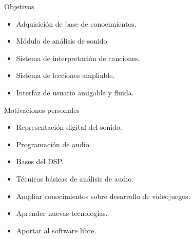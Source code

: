 \documentclass[11pt,xcolor=svgnames]{beamer}
\begin{document}
\begin{frame}{Objetivos}
  \Large
  \begin{itemize}
  \item Adquisición de base de conocimientos. \pause
  \item Módulo de análisis de sonido. \pause
  \item Sistema de interpretación de canciones. \pause
  \item Sistema de lecciones ampliable. \pause
  \item Interfaz de usuario amigable y fluida.
  \end{itemize}
\end{frame}

\begin{frame}{Motivaciones personales}
  \begin{itemize}
  \item Representación digital del sonido.
  \item Programación de audio.\pause

  \item Bases del DSP.
  \item Técnicas básicas de análisis de audio.\pause

  \item Ampliar conocimientos sobre desarrollo de videojuegos.
  \item Aprender nuevas tecnologías.
  \item Aportar al software libre.
  \end{itemize}
\end{frame}
\end{document}
